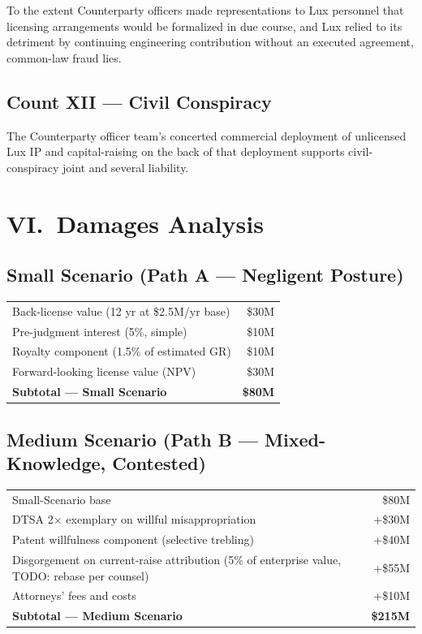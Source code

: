 \documentclass[11pt,letterpaper]{article}
\begin{document}
To the extent Counterparty officers made representations to Lux
personnel that licensing arrangements would be formalized in due
course, and Lux relied to its detriment by continuing engineering
contribution without an executed agreement, common-law fraud lies.

\subsection*{Count XII --- Civil Conspiracy}

The Counterparty officer team's concerted commercial deployment of
unlicensed Lux IP and capital-raising on the back of that deployment
supports civil-conspiracy joint and several liability.

\section*{VI.\ Damages Analysis}

\subsection*{Small Scenario (Path A --- Negligent Posture)}

\begin{center}
\begin{tabular}{lr}
\toprule
Back-license value (12 yr at \$2.5M/yr base) & \$30M \\
Pre-judgment interest (5\%, simple) & \$10M \\
Royalty component (1.5\% of estimated GR) & \$10M \\
Forward-looking license value (NPV) & \$30M \\
\midrule
\textbf{Subtotal --- Small Scenario} & \textbf{\$80M} \\
\bottomrule
\end{tabular}
\end{center}

\subsection*{Medium Scenario (Path B --- Mixed-Knowledge, Contested)}

\begin{center}
\begin{tabular}{lr}
\toprule
Small-Scenario base & \$80M \\
DTSA 2$\times$ exemplary on willful misappropriation & +\$30M \\
Patent willfulness component (selective trebling) & +\$40M \\
Disgorgement on current-raise attribution (5\% of enterprise value, TODO: rebase per counsel) & +\$55M \\
Attorneys' fees and costs & +\$10M \\
\midrule
\textbf{Subtotal --- Medium Scenario} & \textbf{\$215M} \\
\bottomrule
\end{tabular}
\end{center}
\end{document}
